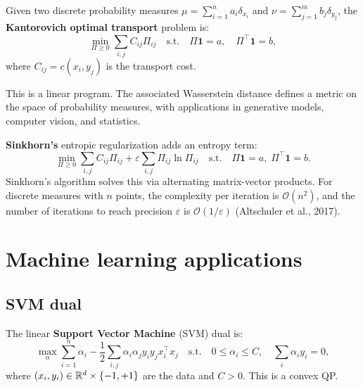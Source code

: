 \begin{definition}
Given two discrete probability measures
$\mu = \sum_{i=1}^n a_i \delta_{x_i}$ and
$\nu = \sum_{j=1}^m b_j \delta_{y_j}$, the \textbf{Kantorovich optimal
transport} problem is:
\[
  \min_{\Pi \geq 0} \sum_{i,j} C_{ij} \Pi_{ij} \quad \text{s.t.} \quad
  \Pi \mathbf{1} = a, \quad \Pi^\top \mathbf{1} = b,
\]
where $C_{ij} = c(x_i, y_j)$ is the transport cost.
\end{definition}

\begin{remark}
This is a linear program. The associated Wasserstein distance defines a metric
on the space of probability measures, with applications in generative models,
computer vision, and statistics.
\end{remark}

\begin{definition}
\textbf{Sinkhorn's} entropic regularization adds an entropy term:
\[
  \min_{\Pi \geq 0} \sum_{i,j} C_{ij} \Pi_{ij}
  + \varepsilon \sum_{i,j} \Pi_{ij} \ln \Pi_{ij} \quad
  \text{s.t.} \quad \Pi \mathbf{1} = a, \; \Pi^\top \mathbf{1} = b.
\]
Sinkhorn's algorithm solves this via alternating matrix-vector products.
For discrete measures with $n$ points, the complexity per iteration is
$\mathcal{O}(n^2)$, and the number of iterations to reach precision
$\varepsilon$ is $\mathcal{O}(1/\varepsilon)$ (Altschuler et al., 2017).
\end{definition}

\section{Machine learning applications}

\subsection{SVM dual}

\begin{definition}
The linear \textbf{Support Vector Machine} (SVM) dual is:
\[
  \max_\alpha \sum_{i=1}^n \alpha_i
  - \frac{1}{2} \sum_{i,j} \alpha_i \alpha_j y_i y_j x_i^\top x_j
  \quad \text{s.t.} \quad
  0 \leq \alpha_i \leq C, \quad \sum_i \alpha_i y_i = 0,
\]
where $(x_i, y_i) \in \mathbb{R}^d \times \{-1, +1\}$ are the data and $C > 0$.
This is a convex QP.
\end{definition}

